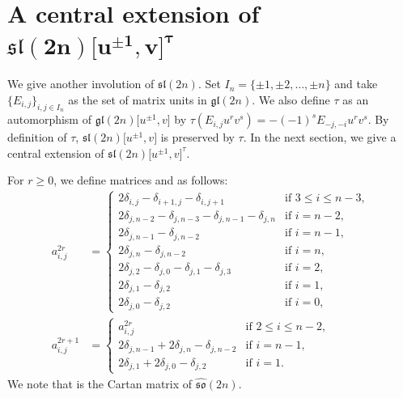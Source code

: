 \documentclass[10pt,a4paper]{amsart}
\numberwithin{equation}{section}
\theoremstyle{definition}
\begin{document}
\section[A central extension of sl(2n){[u\^{}\{pm1\},v]}\^{}tau]{A central extension of $\boldsymbol{\mathfrak{sl}(2n)\bigl[u^{\pm1},v\bigr]^\tau}$}\label{sec:5}
We give another involution of $\mathfrak{sl}(2n)$. Set $I_n=\{\pm1,\pm2,\dots,\pm n\}$ and take $\{E_{i,j}\}_{i,j\in I_n}$ as the set of matrix units in $\mathfrak{gl}(2n)$. We also define $\tau$ as an automorphism of $\mathfrak{gl}(2n)\bigl[u^{\pm1},v\bigr]$ by $\tau(E_{i,j}u^rv^s)=-(-1)^sE_{-j,-i}u^rv^s$. By definition of $\tau$, $\mathfrak{sl}(2n)\bigl[u^{\pm1},v\bigr]$ is preserved by $\tau$. In the next section, we give a central extension of $\mathfrak{sl}(2n)\bigl[u^{\pm1},v\bigr]^\tau$.

For $r\geq0$, we define matrices  and  as follows:
\begin{align*}
a^{2r}_{i,j}&=\begin{cases}
2\delta_{i,j}-\delta_{i+1,j}-\delta_{i,j+1}&\text{if }3\leq i\leq n-3,\\
2\delta_{j,n-2}-\delta_{j,n-3}-\delta_{j,n-1}-\delta_{j,n}&\text{if }i=n-2,\\
2\delta_{j,n-1}-\delta_{j,n-2}&\text{if }i=n-1,\\
2\delta_{j,n}-\delta_{j,n-2}&\text{if }i=n,\\
2\delta_{j,2}-\delta_{j,0}-\delta_{j,1}-\delta_{j,3}&\text{if }i=2,\\
2\delta_{j,1}-\delta_{j,2}&\text{if }i=1,\\
2\delta_{j,0}-\delta_{j,2}&\text{if }i=0,
\end{cases}\\
a^{2r+1}_{i,j}&=\begin{cases}
a^{2r}_{i,j}&\text{if }2\leq i\leq n-2,\\
2\delta_{j,n-1}+2\delta_{j,n}-\delta_{j,n-2}&\text{if }i=n-1,\\
2\delta_{j,1}+2\delta_{j,0}-\delta_{j,2}&\text{if }i=1.
\end{cases}
\end{align*}
We note that  is the Cartan matrix of $\widehat{\mathfrak{so}}(2n)$.
\end{document}

